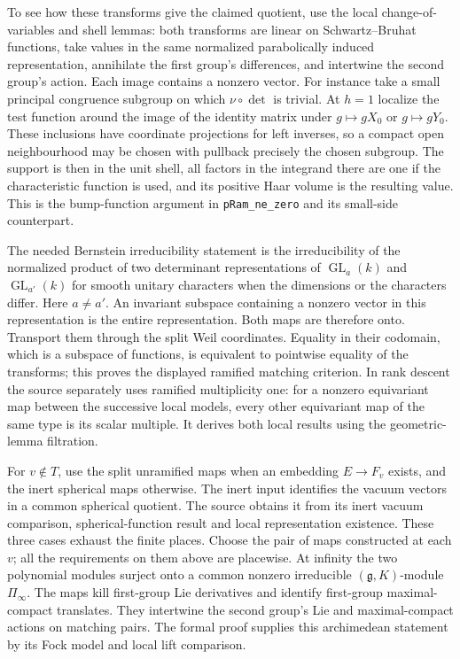 To see how these transforms give the claimed quotient, use the
local change-of-variables and shell lemmas: both transforms are
linear on Schwartz--Bruhat functions, take values in the same
normalized parabolically induced representation, annihilate the
first group's differences, and intertwine the second group's action.
Each image contains a nonzero vector. For instance take a small
principal congruence subgroup on which \(\nu\circ\det\) is trivial.
At \(h=1\) localize the test function around the image of the
identity matrix under \(g\mapsto gX_0\) or \(g\mapsto gY_0\).
These inclusions have coordinate projections for left inverses,
so a compact open neighbourhood may be chosen with pullback
precisely the chosen subgroup. The support is then in the unit
shell, all factors in the integrand there are one if the
characteristic function is used, and its positive Haar volume is
the resulting value. This is the bump-function argument in
\texttt{p\allowbreak{}Ram\_\allowbreak{}ne\_\allowbreak{}zero} and its small-side counterpart.

The needed Bernstein irreducibility statement is the irreducibility
of the normalized product of two determinant representations of
\(\operatorname{GL}_a(k)\) and \(\operatorname{GL}_{a'}(k)\) for
smooth unitary characters when the dimensions or the characters
differ. Here \(a\ne a'\). An invariant subspace containing a
nonzero vector in this representation is the entire representation.
Both maps are therefore onto. Transport them through the split
Weil coordinates. Equality in their codomain, which is a subspace
of functions, is equivalent to pointwise equality of the transforms;
this proves the displayed ramified matching criterion.
In rank descent the source separately uses ramified multiplicity one:
for a nonzero equivariant map between the successive local models,
every other equivariant map of the same type is its scalar multiple.
It derives both local results using the geometric-lemma filtration.

For \(v\notin T\), use the split unramified maps when an embedding
\(E\longrightarrow F_v\) exists, and the inert spherical maps
otherwise. The inert input identifies the vacuum vectors in a common
spherical quotient. The source obtains it from its inert vacuum
comparison, spherical-function result and local representation
existence. These three cases exhaust the finite places. Choose the
pair of maps constructed at each \(v\); all the requirements on
them above are placewise. At infinity the two polynomial modules
surject onto a common nonzero irreducible \((\mathfrak g,K)\)-module
\(\Pi_\infty\). The maps kill first-group Lie derivatives and identify
first-group maximal-compact translates. They intertwine the
second group's Lie and maximal-compact actions on matching pairs.
The formal proof supplies this archimedean statement by its Fock model
and local lift comparison.

